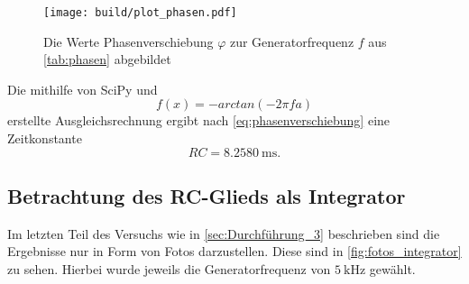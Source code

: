 \begin{figure}
    \centering
    \texttt{[image: build/plot\_phasen.pdf]}
    \caption{Die Werte Phasenverschiebung $\varphi$ zur Generatorfrequenz $f$ aus \autoref{tab:phasen} abgebildet}
    \label{fig:plot_phasen}
\end{figure}

Die mithilfe von SciPy\cite{scipy} und
\begin{equation}
    f(x)=-arctan(-2\pi f a)
\end{equation}
erstellte Ausgleichsrechnung ergibt nach \autoref{eq:phasenverschiebung} eine Zeitkonstante
\begin{equation}
    RC = \SI{8.2580}{\milli\second}.
\end{equation}

\subsection{Betrachtung des RC-Glieds als Integrator}
\label{sec:Auswertung_Integrator}

Im letzten Teil des Versuchs wie in \autoref{sec:Durchführung_3} beschrieben sind die Ergebnisse nur in Form von Fotos darzustellen. Diese sind in \autoref{fig:fotos_integrator} zu sehen. Hierbei wurde jeweils die Generatorfrequenz von $\SI{5}{\kilo\hertz}$ gewählt.

